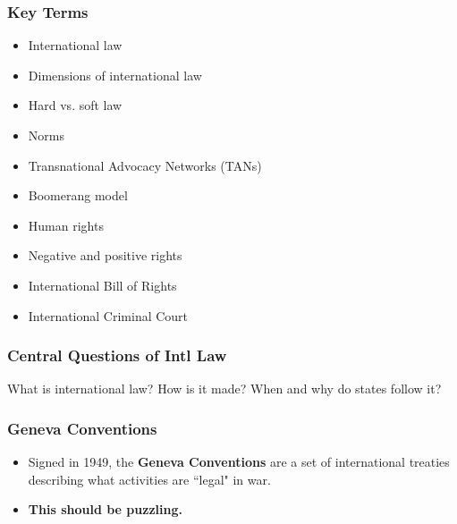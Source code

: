 \documentclass{beamer}
\begin{document}
\begin{frame} 
	\frametitle{\LARGE{Key Terms}}
	\begin{itemize}
		\item International law
		\item Dimensions of international law
		\item Hard vs. soft law
		\item Norms
		\item Transnational Advocacy Networks (TANs)
		\item Boomerang model
		\item Human rights
		\item Negative and positive rights
		\item International Bill of Rights
		\item International Criminal Court
	\end{itemize}
\end{frame}

\begin{frame} 
	\frametitle{\LARGE{Central Questions of Intl Law}}
	\centering
	\Large{What is international law? How is it made? When and why do states follow it?}
\end{frame}


\begin{frame} 
	\frametitle{\LARGE{Geneva Conventions}}
	\begin{itemize}
		\item Signed in 1949, the \textbf{Geneva Conventions} are a set of international treaties describing what activities are ``legal" in war. \pause
		\item \textbf{This should be puzzling.}
	\end{itemize}
\end{frame}
\end{document}
